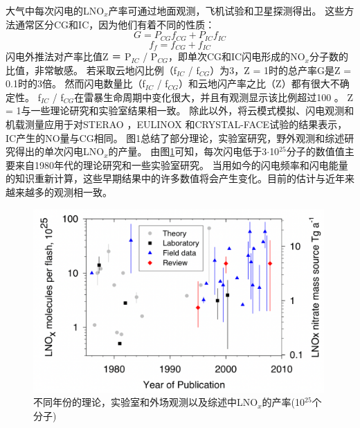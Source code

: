 大气中每次闪电的LNO$_x$产率可通过地面观测\citep{Noxon.1976}，飞机试验\citep{Chameides.1987}和卫星探测\citep{Beirle.2004}得出。
这些方法通常区分CG和IC，因为他们有着不同的性质：
\begin{equation}
G = P\textrm{$_{CG}$}f\textrm{$_{CG}$}  + P\textrm{$_{IC}$}f\textrm{$_{IC}$}
\end{equation}
\begin{equation}
f\textrm{$_{f}$}  = f\textrm{$_{CG}$}  + f\textrm{$_{IC}$}
\end{equation}
闪电外推法对产率比值Z ＝ P\textrm{$_{IC}$} / P\textrm{$_{CG}$}，即单次CG和IC闪电形成的NO$_x$分子数的比值，非常敏感\citep{Bond.2002}。
若采取云地闪比例（f\textrm{$_{IC}$} / f\textrm{$_{CG}$}）为3，Z = 1时的总产率G是Z = 0.1时的3倍\citep{Gallardo.1996,Ridley.2004,Ridley.2005}。
然而闪电数量比（f\textrm{$_{IC}$} / f\textrm{$_{CG}$}）和云地闪产率之比（Z）都有很大不确定性。
f\textrm{$_{IC}$} / f\textrm{$_{CG}$}在雷暴生命周期中变化很大，并且有观测显示该比例超过100 \citep{Dye.2000,DeCaria.2005,Ott.2007}。
Z = 1与一些理论研究\citep{Cooray.1997}和实验室结果\citep{Cooray.2005}相一致。
除此以外，将云模式模拟、闪电观测和机载测量应用于对STERAO \citep{DeCaria.2000}，EULINOX \citep{Fehr.2004}和CRYSTAL-FACE试验的结果表示，IC产生的NO量与CG相同。
图1总结了部分理论，实验室研究，野外观测和综述研究得出的单次闪电LNO$_x$的产量。
由图\ref{figure:lnox_production_Schumann}可知，每次闪电低于3$\cdot$10$^{25}$分子的数值值主要来自1980年代的理论研究和一些实验室研究。
当用如今的闪电频率和闪电能量的知识重新计算，这些早期结果中的许多数值将会产生变化。目前的估计与近年来越来越多的观测相一致。


\begin{figure}[htbp]
\centering
\includegraphics[width=30em]{./figures/lnox_production_Schumann.png}
\caption{不同年份的理论，实验室和外场观测以及综述中LNO$_x$的产率(10$^{25}$个分子)}
\label{figure:lnox_production_Schumann}
\end{figure}


